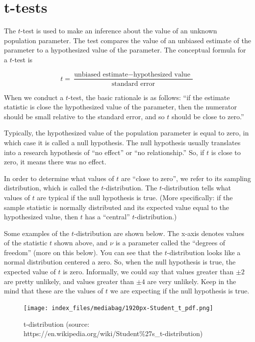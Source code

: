 \documentclass[
  letterpaper,
  DIV=11,
  numbers=noendperiod]{scrreprt}
\begin{document}
\hypertarget{t-tests}{%
\section{t-tests}\label{t-tests}}

The \(t\)-test is used to make an inference about the value of an
unknown population parameter. The test compares the value of an unbiased
estimate of the parameter to a hypothesized value of the parameter. The
conceptual formula for a \(t\)-test is

\[ t = \frac{\text{unbiased estimate} - \text{hypothesized value }}{\text{standard error}} \]

When we conduct a \(t\)-test, the basic rationale is as follows: ``if
the estimate statistic is close the hypothesized value of the parameter,
then the numerator should be small relative to the standard error, and
so \(t\) should be close to zero.''

Typically, the hypothesized value of the population parameter is equal
to zero, in which case it is called a null hypothesis. The null
hypothesis usually translates into a research hypothesis of ``no
effect'' or ``no relationship.'' So, if \(t\) is close to zero, it means
there was no effect.

In order to determine what values of \(t\) are ``close to zero'', we
refer to its sampling distribution, which is called the
\(t\)-distribution. The \(t\)-distribution tells what values of \(t\)
are typical if the null hypothesis is true. (More specifically: if the
sample statistic is normally distributed and its expected value equal to
the hypothesized value, then \(t\) has a ``central''
\(t\)-distribution.)

Some examples of the \(t\)-distribution are shown below. The x-axis
denotes values of the statistic \(t\) shown above, and \(\nu\) is a
parameter called the ``degrees of freedom'' (more on this below). You
can see that the \(t\)-distribution looks like a normal distribution
centered a zero. So, when the null hypothesis is true, the expected
value of \(t\) is zero. Informally, we could say that values greater
than \(\pm 2\) are pretty unlikely, and values greater than \(\pm 4\)
are very unlikely. Keep in the mind that these are the values of \(t\)
we are expecting if the null hypothesis is true.

\begin{figure}

{\centering \texttt{[image: index\_files/mediabag/1920px-Student\_t\_pdf.png]}

}

\caption{\label{fig-tdist}t-distribution (source:
https://en.wikipedia.org/wiki/Student\%27s\_t-distribution)}

\end{figure}
\end{document}
